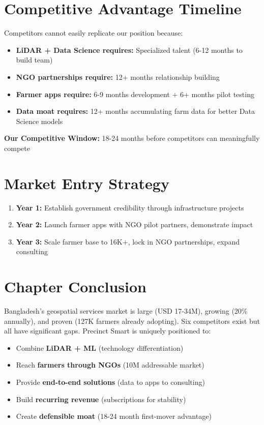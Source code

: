 \section{Competitive Advantage Timeline}

Competitors cannot easily replicate our position because:

\begin{itemize}
    \item \textbf{LiDAR + Data Science requires:} Specialized talent (6-12 months to build team)
    \item \textbf{NGO partnerships require:} 12+ months relationship building
    \item \textbf{Farmer apps require:} 6-9 months development + 6+ months pilot testing
    \item \textbf{Data moat requires:} 12+ months accumulating farm data for better Data Science models
\end{itemize}

\textbf{Our Competitive Window:} 18-24 months before competitors can meaningfully compete

\section{Market Entry Strategy}

\begin{enumerate}
    \item \textbf{Year 1:} Establish government credibility through infrastructure projects
    \item \textbf{Year 2:} Launch farmer apps with NGO pilot partners, demonstrate impact
    \item \textbf{Year 3:} Scale farmer base to 16K+, lock in NGO partnerships, expand consulting
\end{enumerate}

\section{Chapter Conclusion}

Bangladesh's geospatial services market is large (USD 17-34M), growing (20\% annually), and proven (127K farmers already adopting). Six competitors exist but all have significant gaps. Precinct Smart is uniquely positioned to:

\begin{itemize}
    \item Combine \textbf{LiDAR + ML} (technology differentiation)
    \item Reach \textbf{farmers through NGOs} (10M addressable market)
    \item Provide \textbf{end-to-end solutions} (data to apps to consulting)
    \item Build \textbf{recurring revenue} (subscriptions for stability)
    \item Create \textbf{defensible moat} (18-24 month first-mover advantage)
\end{itemize}

